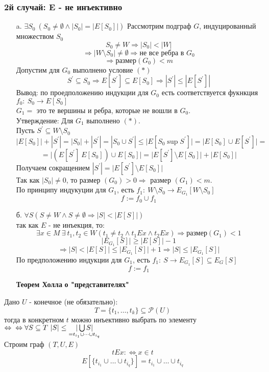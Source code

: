 \documentclass[12pt, letterpaper, twoside]{article}
\begin{document}
\subsubsection*{2й случай: E - не инъективно}
\begin{enumerate}
    \item [a.] $\exists S_0\ (S_0\neq \emptyset\wedge |S_0| = |E[S_0]|)$
    Рассмотрим подграф $G$, индуцированный множеством $S_0$
    $$S_0 \neq W\Rightarrow |S_0| < |W|$$
    $$\Rightarrow |W\setminus S_0|\neq \emptyset\Rightarrow \text{не все ребра в } G_0$$
    $$\Rightarrow \text{размер}(G_0) < m$$
    Допустим для $G_0$ выполнено условие $(*)$
    $$S^{\prime}\subseteq S_0\Rightarrow E[S^{\prime}]\subseteq E[S_0]\Rightarrow |S^{\prime}| \leq |E[S^{\prime}]|$$
    Вывод: по проедположению индукции для $G_0$ есть соответствуется фукнкция $f_0:\ S_0\rightarrow E[S_0]$\\
    $G_1 =$ это те вершины и ребра, которые не вошли в $G_0$.\\
    Утверждение: Для $G_1$ выполнено $(*)$.\\
    Пусть $S^{\prime} \subseteq W\setminus S_0$
    $$\big|E[S_0]\big| + |S^{\prime}| = |S_0| + |S^{\prime}| = |S_0\cup S^{\prime}| \leq \big|E[S_0\sup S^{\prime}]\big| = \big|E[S_0]\cup E[S^{\prime}]\big| = $$
    $$= \big|(E[S^{\prime}] \ E[S_0]) \cup E[S_0]\big| = \big|E[S^{\prime}] \setminus E[S_0]\big| + \big|E[S_0]\big|$$
    Получаем сокращением $|S^{\prime}| = \big|E[S^{\prime}] \setminus E[S_0]\big|$\\
    Так как $|S_0| \neq 0$, то размер $(G_0) > 0\Rightarrow$ размер $(G_1) < m$.\\
    По принципу индукуции для $G_1$, есть $f_1:\ W\setminus S_0\rightarrow E_{G_1}[W\setminus S_0]$
    $$f := f_0\cup f_1$$
    \item [б.] $\forall S \left(S\neq W\wedge S\neq \emptyset \Rightarrow |S| < \big|E[S]\big|\right)$\\
    так как $E$ - не инъекция, то:
    \[\exists x\in M\ \exists\ t_1, t_2\in W (t_1\neq t_2\wedge t_1Ex\wedge t_2Ex)\Rightarrow \text{размер} (G_1) < 1\]
    $$\big|E_{G_1}[S]\big| \geq \big|E[S]\big| - 1$$
    $$\Rightarrow |S| < \big|E[S]\big| \leq \big|E_{G_1}[S]\big| + 1\Rightarrow |S| \leq \big|E_{G_1}[S]\big|$$
    По предположению индукции для $G_1$, есть $f_1:\ S\rightarrow E_{G_1}[S]\subseteq E_G[S]$
    $$f := f_1$$
\end{enumerate}
\begin{enumerate}
    \item[\textbf{Теорем Холла}] \textbf{о "представителях"} 
\end{enumerate}
Дано $U$ - конечное (не обязательно):
$$T = \{ t_1, \dots, t_k \}\subseteq \mathcal{P}(U)$$
тогда в конкретном $t$ можно инъективно выбрать по элементу $\Leftrightarrow\\
\Leftrightarrow \forall S\subseteq T\ |S| \leq \underset{= t_{i_1}\cup \dots \cup t_{i_q}}{|\bigcup S|}$\\
Строим граф $(T, U, E)$
$$tEx :\Leftrightarrow x\in t$$
$$E[\{ t_{i_1}\cup \dots \cup t_{i_q} \}] = t_{i_1}\cup \dots \cup t_{i_q}$$
\end{document}
